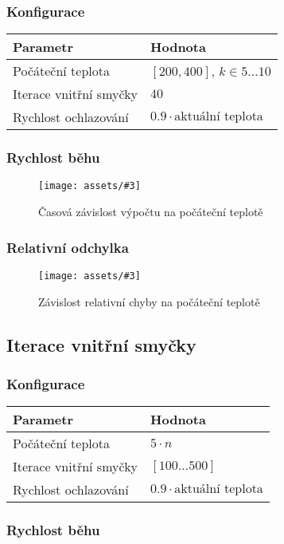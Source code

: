 \documentclass[czech]{article}
\newcommand{\image}[3]{
    \begin{figure}[H]
        \centering
        \texttt{[image: assets/\#3]}
        \caption{#2}
        \label{fig:#1}
    \end{figure}
}
\begin{document}
\subsubsection*{Konfigurace}

\begin{tabular}{ | l | l | }
    \hline
    Parametr & Hodnota \\ \hline \hline
    Počáteční teplota & $[200, 400]$, $k \in 5\dots10$ \\
    Iterace vnitřní smyčky & $40$ \\
    Rychlost ochlazování & $0.9 \cdot \textrm{aktuální teplota}$ \\ \hline
\end{tabular}

\subsubsection*{Rychlost běhu}

\image{dur-initial-temperature}{Časová závislost výpočtu na počáteční teplotě}{dur-initial-temperature.png}

\subsubsection*{Relativní odchylka}

\image{acc-initial-temperature}{Závislost relativní chyby na počáteční teplotě}{acc-initial-temperature.png}

\subsection{Iterace vnitřní smyčky}

\subsubsection*{Konfigurace}

\begin{tabular}{ | l | l | }
    \hline
    Parametr & Hodnota \\ \hline \hline
    Počáteční teplota & $5 \cdot n$ \\
    Iterace vnitřní smyčky & $[100\dots500]$ \\
    Rychlost ochlazování & $0.9 \cdot \textrm{aktuální teplota}$ \\ \hline
\end{tabular}

\subsubsection*{Rychlost běhu}
\end{document}
